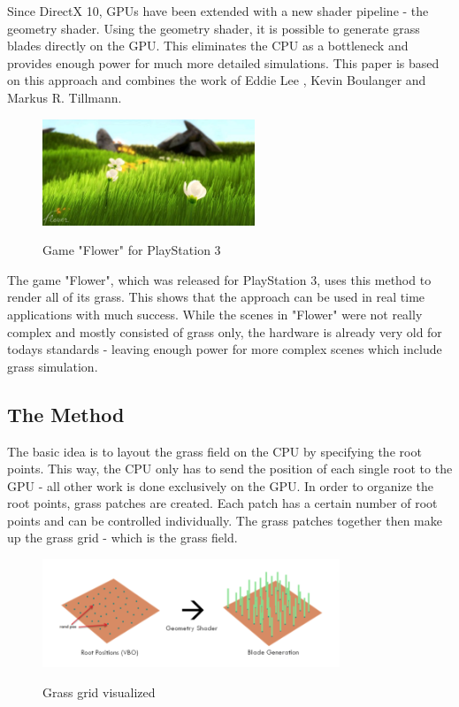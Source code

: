 \documentclass[conference]{acmsiggraph}
\begin{document}
Since DirectX 10, GPUs have been extended with a new shader pipeline - the geometry shader. Using the geometry shader, it is possible to generate grass blades directly on the GPU. This eliminates the CPU as a bottleneck and provides enough power for much more detailed simulations. This paper is based on this approach and combines the work of Eddie Lee \cite{EddieLee}, Kevin Boulanger \cite{KevinBoulanger} and Markus R. Tillmann.  \cite{Tillmann}

 \begin{figure}[ht]
   \centering
   \includegraphics[width=2.5in]{images/flower_game}
   \caption{Game "Flower" for PlayStation 3} \cite{Flower}
 \end{figure}
 
The game "Flower", which was released for PlayStation 3, uses this method to render all of its grass. This shows that the approach can be used in real time applications with much success. While the scenes in "Flower" were not really complex and mostly consisted of grass only, the hardware is already very old for todays standards - leaving enough power for more complex scenes which include grass simulation.

\subsection{The Method}
The basic idea is to layout the grass field on the CPU by specifying the root points. This way, the CPU only has to send the position of each single root to the GPU - all other work is done exclusively on the GPU. In order to organize the root points, grass patches are created. Each patch has a certain number of root points and can be controlled individually. The grass patches together then 
make up the grass grid - which is the grass field.

 \begin{figure}[ht]
   \centering
   \includegraphics[width=3.5in]{images/grass_grid}
   \caption{Grass grid visualized} \cite{EddieLee}
 \end{figure}
\end{document}
